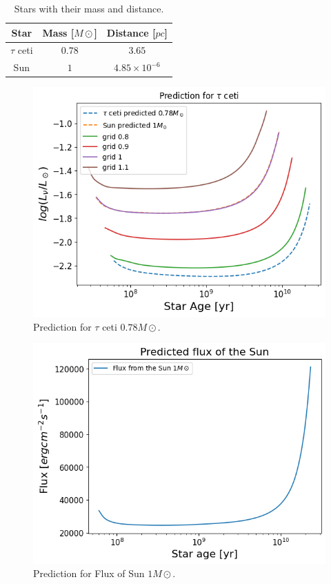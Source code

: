 \begin{table}[H]
    \centering
	\caption{Stars with their mass and distance.}
	\label{tab:stars and mass}
	\begin{tabular}{ccc}
		\toprule
		Star & Mass [$M\odot$]  & Distance [$pc$] \\
		\midrule
		$\tau$ ceti & $0.78$ & $3.65$\\
		Sun & $1$ & $4.85\times 10^{-6}$\\
		\bottomrule
	\end{tabular}
\end{table}

\begin{figure}[H]
	\centering
	\includegraphics[width=\textwidth]{assets/predtauceti.png}
	\caption{Prediction for $\tau$ ceti $0.78 M\odot$.}
	\label{fig:tau}
\end{figure}

\begin{figure}[H]
	\centering
	\includegraphics[width=\textwidth]{assets/fluxsun.png}
	\caption{Prediction for Flux of Sun $1 M\odot$.}
	\label{fig:fluxsun}
\end{figure}

